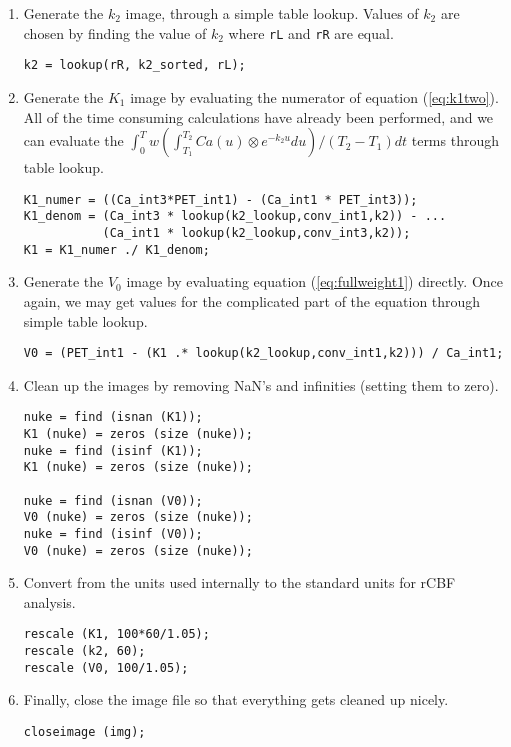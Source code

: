 \documentclass[12pt]{article}
\def\code#1{{\tt #1}}
\begin{document}
\begin{enumerate}
\item Generate the $k_2$ image, through a simple table lookup.
Values of $k_2$ are chosen by finding the value of $k_2$ where
\code{rL} and \code{rR} are equal.
\begin{verbatim}
k2 = lookup(rR, k2_sorted, rL);
\end{verbatim}

\item Generate the $K_1$ image by evaluating the numerator of
equation (\ref{eq:k1two}).  All of the time consuming calculations
have already been performed, and we can evaluate the $\int_{0}^{T} w
(\int_{T_1}^{T_2} Ca(u) \otimes e^{-k_{2}u} du)/(T_2 - T_1) dt$ terms
through table lookup.
\begin{verbatim}
K1_numer = ((Ca_int3*PET_int1) - (Ca_int1 * PET_int3));
K1_denom = (Ca_int3 * lookup(k2_lookup,conv_int1,k2)) - ...
           (Ca_int1 * lookup(k2_lookup,conv_int3,k2));
K1 = K1_numer ./ K1_denom;
\end{verbatim}

\item Generate the $V_0$ image by evaluating equation
(\ref{eq:fullweight1}) directly.  Once again, we may get values for
the complicated part of the equation through simple table lookup.
\begin{verbatim}
V0 = (PET_int1 - (K1 .* lookup(k2_lookup,conv_int1,k2))) / Ca_int1;
\end{verbatim}

\item Clean up the images by removing NaN's and infinities (setting
them to zero).
\begin{verbatim}
nuke = find (isnan (K1));
K1 (nuke) = zeros (size (nuke));
nuke = find (isinf (K1));
K1 (nuke) = zeros (size (nuke));

nuke = find (isnan (V0));
V0 (nuke) = zeros (size (nuke));
nuke = find (isinf (V0));
V0 (nuke) = zeros (size (nuke));
\end{verbatim}

\item Convert from the units used internally to the standard units for
  rCBF analysis.
  \begin{verbatim}
rescale (K1, 100*60/1.05);
rescale (k2, 60);
rescale (V0, 100/1.05);
  \end{verbatim}

\item Finally, close the image file so that everything gets cleaned
up nicely.
\begin{verbatim}
closeimage (img);
\end{verbatim}

\end{enumerate}
\end{document}
